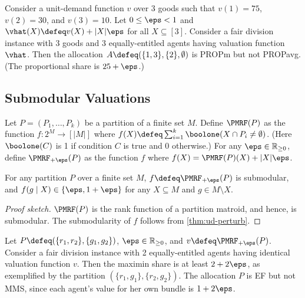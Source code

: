 \begin{example}
\label{cex:ud:propm-not-propavg}
Consider a unit-demand function $v$ over 3 goods such that
$v(1) = 75$, $v(2) = 30$, and $v(3) = 10$.
Let $0 \le \eps < 1$ and $\vhat(X) \defeq v(X) + |X|\eps$ for all $X \subseteq [3]$.
Consider a fair division instance with 3 goods and
3 equally-entitled agents having valuation function $\vhat$.
Then the allocation $A \defeq (\{1, 3\}, \{2\}, \emptyset)$ is PROPm but not PROPavg.
(The proportional share is $25+\eps$.)
\end{example}

\subsection{Submodular Valuations}
\label{sec:cex-extra:submod}

\begin{definition}[PMRF]
\label{defn:pmrf}
Let $P = (P_1, \ldots, P_k)$ be a partition of a finite set $M$.
Define $\PMRF(P)$ as the function $f: 2^M \to [|M|]$ where
$f(X) \defeq \sum_{i=1}^k \boolone(X \cap P_i \neq \emptyset)$.
(Here $\boolone(C)$ is 1 if condition $C$ is true and 0 otherwise.)
For any $\eps \in \mathbb{R}_{\ge 0}$, define $\PMRF_{+\eps}(P)$
as the function $f$ where $f(X) = \PMRF(P)(X) + |X|\eps$.
\end{definition}

\begin{lemma}
\label{thm:pmrf-submod}
For any partition $P$ over a finite set $M$,
$f \defeq \PMRF_{+\eps}(P)$ is submodular, and $f(g \mid X) \in \{\eps, 1+\eps\}$
for any $X \subseteq M$ and $g \in M \setminus X$.
\end{lemma}
\begin{proof}[Proof sketch]
$\PMRF(P)$ is the rank function of a partition matroid, and hence, is submodular.
The submodularity of $f$ follows from \cref{thm:ud-perturb}.
\end{proof}

\begin{example}
\label{cex:ef-not-mms-pmrf}
Let $P \defeq (\{r_1, r_2\}, \{g_1, g_2\})$, $\eps \in \mathbb{R}_{\ge 0}$,
and $v \defeq \PMRF_{+\eps}(P)$.
Consider a fair division instance with 2 equally-entitled agents
having identical valuation function $v$.
Then the maximin share is at least $2 + 2\eps$,
as exemplified by the partition $(\{r_1, g_1\}, \{r_2, g_2\})$.
The allocation $P$ is EF but not MMS,
since each agent's value for her own bundle is $1 + 2\eps$.
\end{example}

